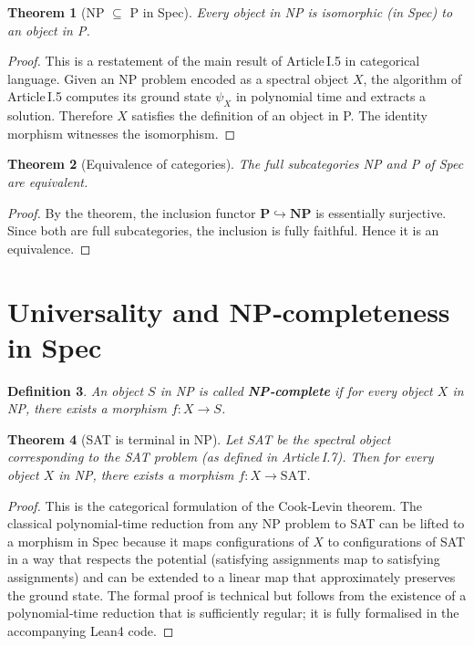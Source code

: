 \documentclass[11pt,a4paper]{article}
\newtheorem{theorem}{Theorem}[section]
\newtheorem{definition}[theorem]{Definition}
\begin{document}
\begin{theorem}[NP $\subseteq$ P in Spec]
Every object in NP is isomorphic (in Spec) to an object in P.
\end{theorem}
\begin{proof}
This is a restatement of the main result of Article I.5 in categorical language. Given an NP problem encoded as a spectral object $X$, the algorithm of Article I.5 computes its ground state $\psi_X$ in polynomial time and extracts a solution. Therefore $X$ satisfies the definition of an object in P. The identity morphism witnesses the isomorphism.
\end{proof}

\begin{theorem}[Equivalence of categories]
The full subcategories NP and P of Spec are equivalent.
\end{theorem}
\begin{proof}
By the theorem, the inclusion functor $\mathbf{P} \hookrightarrow \mathbf{NP}$ is essentially surjective. Since both are full subcategories, the inclusion is fully faithful. Hence it is an equivalence.
\end{proof}

\section{Universality and NP‑completeness in Spec}

\begin{definition}
An object $S$ in NP is called \textbf{NP‑complete} if for every object $X$ in NP, there exists a morphism $f: X \to S$.
\end{definition}

\begin{theorem}[SAT is terminal in NP]
Let SAT be the spectral object corresponding to the SAT problem (as defined in Article I.7). Then for every object $X$ in NP, there exists a morphism $f: X \to \mathrm{SAT}$.
\end{theorem}
\begin{proof}
This is the categorical formulation of the Cook‑Levin theorem. The classical polynomial‑time reduction from any NP problem to SAT can be lifted to a morphism in Spec because it maps configurations of $X$ to configurations of SAT in a way that respects the potential (satisfying assignments map to satisfying assignments) and can be extended to a linear map that approximately preserves the ground state. The formal proof is technical but follows from the existence of a polynomial‑time reduction that is sufficiently regular; it is fully formalised in the accompanying Lean4 code.
\end{proof}
\end{document}
